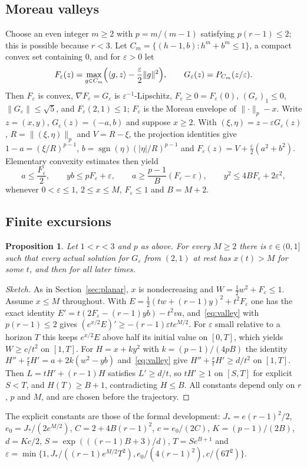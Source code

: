 \documentclass[11pt]{article}
\numberwithin{equation}{section}
\newtheorem{proposition}[theorem]{Proposition}
\theoremstyle{definition}
\theoremstyle{remark}
\newcommand{\ip}[2]{\langle #1,#2\rangle}
\newcommand{\norm}[1]{\lVert #1\rVert}
\newcommand{\eps}{\varepsilon}
\begin{document}
\subsection{Moreau valleys}
Choose an even integer $m\ge2$ with $p=m/(m-1)$ satisfying $p(r-1)\le2$; this is possible because $r<3$. Let $C_m=\{(h-1,b):h^m+b^m\le1\}$, a compact convex set containing $0$, and for $\eps>0$ let
\[
F_\eps(z)=\max_{g\in C_m}\Bigl(\ip gz-\frac\eps2\norm g^2\Bigr),\qquad G_\eps(z)=P_{C_m}(z/\eps).
\]
Then $F_\eps$ is convex, $\nabla F_\eps=G_\eps$ is $\eps^{-1}$-Lipschitz, $F_\eps\ge0=F_\eps(0)$, $(G_\eps)_1\le0$, $\norm{G_\eps}\le\sqrt5$, and $F_\eps(2,1)\le1$; $F_\eps$ is the Moreau envelope of $\norm{\cdot}_p-x$. Write $z=(x,y)$, $G_\eps(z)=(-a,b)$ and suppose $x\ge2$. With $(\xi,\eta)=z-\eps G_\eps(z)$, $R=\norm{(\xi,\eta)}_p$ and $V=R-\xi$, the projection identities give $1-a=(\xi/R)^{p-1}$, $b=\operatorname{sgn}(\eta)(|\eta|/R)^{p-1}$ and $F_\eps(z)=V+\frac\eps2(a^2+b^2)$. Elementary convexity estimates then yield
\begin{equation}\label{eq:valley}
a\le\frac{F_\eps}{2},\qquad yb\le pF_\eps+\eps,\qquad a\ge\frac{p-1}{B}(F_\eps-\eps),\qquad y^2\le4BF_\eps+2\eps^2,
\end{equation}
whenever $0<\eps\le1$, $2\le x\le M$, $F_\eps\le1$ and $B=M+2$.

\subsection{Finite excursions}
\begin{proposition}\label{prop:excursion}
Let $1<r<3$ and $p$ as above. For every $M\ge2$ there is $\eps\in(0,1]$ such that every actual solution for $G_\eps$ from $(2,1)$ at rest has $x(t)>M$ for some $t$, and then for all later times.
\end{proposition}
\begin{proof}[Sketch]
As in Section~\ref{sec:planar}, $x$ is nondecreasing and $W=\frac12w^2+F_\eps\le1$. Assume $x\le M$ throughout. With $E=\frac12(tw+(r-1)y)^2+t^2F_\eps$ one has the exact identity $E'=t(2F_\eps-(r-1)yb)-t^2va$, and~\eqref{eq:valley} with $p(r-1)\le2$ gives $(e^{x/2}E)'\ge-(r-1)\eps te^{M/2}$. For $\eps$ small relative to a horizon $T$ this keeps $e^{x/2}E$ above half its initial value on $[0,T]$, which yields $W\ge c/t^2$ on $[1,T]$. For $H=x+ky^2$ with $k=(p-1)/(4pB)$ the identity $H''+\frac rtH'=a+2k(w^2-yb)$ and~\eqref{eq:valley} give $H''+\frac rtH'\ge d/t^2$ on $[1,T]$. Then $L=tH'+(r-1)H$ satisfies $L'\ge d/t$, so $tH'\ge1$ on $[S,T]$ for explicit $S<T$, and $H(T)\ge B+1$, contradicting $H\le B$. All constants depend only on $r$, $p$ and $M$, and are chosen before the trajectory.
\end{proof}
The explicit constants are those of the formal development: $J_*=e(r-1)^2/2$, $e_0=J_*/(2e^{M/2})$, $C=2+4B(r-1)^2$, $c=e_0/(2C)$, $K=(p-1)/(2B)$, $d=Kc/2$, $S=\exp(((r-1)B+3)/d)$, $T=Se^{B+1}$ and $\eps=\min\{1,J_*/((r-1)e^{M/2}T^2),e_0/(4(r-1)^2),c/(6T^2)\}$.
\end{document}
